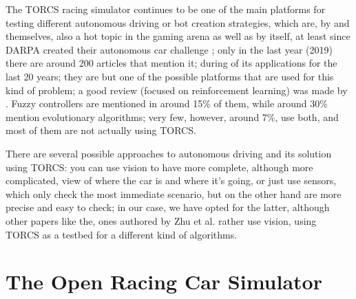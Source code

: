 \documentclass[10pt,journal,compsoc]{IEEEtran}
\begin{document}

The TORCS racing simulator continues to be one of the main platforms
for testing different autonomous driving or bot creation strategies,
which are, by and themselves, also a hot topic in the gaming arena as
well as by itself, at least since DARPA created their autonomous car
challenge \cite{badue2019selfdriving};
only in the last year (2019) there are around 200 articles that
mention it; during  \cite{schiavullo2019torcs} of its
applications for the last 20 years; they are but one of the possible
platforms that are used for this kind of problem; a good review
(focused on reinforcement learning) was made by
\cite{abuzekry2comparative}. Fuzzy controllers are mentioned in around
15\% of them, while around 30\% mention evolutionary algorithms; very
few, however, around 7\%, use both, and most of them are not actually
using TORCS.

There are several possible approaches to autonomous driving and its
solution using TORCS: you can use vision to have more complete,
although more complicated, view of where the car is and where it's
going, or just use sensors, which only check the most immediate
scenario, but on the other hand are more precise and easy to check; in
our case, we have opted for the latter, although other papers like the,
ones authored by Zhu et al. \cite{zhu2018driving,zhu2019vision,neurone} rather
use vision, using TORCS as a testbed for a different kind of algorithms.



\section{The Open Racing Car Simulator}
\label{sec:torcs}
\end{document}
